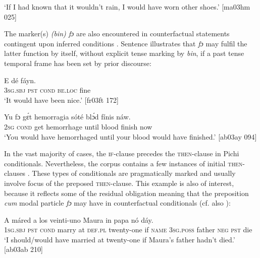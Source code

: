 \glt ‘If I had known that it wouldn’t rain, I would have worn
other shoes.’ [ma03hm 025]
\z

The marker(s) \textit{(bin) fɔ} are also encountered in counterfactual statements contingent upon inferred conditions . Sentence  illustrates that \textit{fɔ} may fulfil the latter function by itself, without explicit tense marking by \textit{bin}, if a past tense temporal frame has been set by prior discourse: 


\ea%
    \label{ex:key:1531}
    \gll E           dé    fáyn.\\
\textsc{3sg.sbj}  \textsc{pst}    \textsc{cond}    \textsc{be.loc}  fine\\

\glt ‘It would have been nice.’ [fr03ft 172]
\z


\ea%
    \label{ex:key:1532}
    \gll Yu  fɔ    gɛ́t  hemorragia  sóté    blɔ́d    fínis    náw.\\
\textsc{2sg}  \textsc{cond}    get  hemorrhage  until  blood  finish  now\\

\glt ‘You would have hemorrhaged until your blood would have finished.’ [ab03ay 094]
\z

In the vast majority of cases, the \textsc{if-}clause precedes the \textsc{then-}clause in Pichi conditionals. Nevertheless, the corpus contains a few instances of initial \textsc{then-}clauses . These types of conditionals are pragmatically marked and usually involve focus of the preposed \textsc{then-}clause. This example is also of interest, because it reflects some of the residual obligation meaning that the preposition \textit{cum} modal particle \textit{fɔ} may have in counterfactual conditionals (cf. also ): 


\ea%
    \label{ex:key:1533}
    \gll A       máred  a  los    veinti-uno    Maura
in    papa  nó    dáy.\\
\textsc{1sg.sbj}  \textsc{pst}  \textsc{cond}    marry  at  \textsc{def.pl}  twenty-one  if  \textsc{name}
\textsc{3sg.poss}  father  \textsc{neg}  \textsc{pst}  die\\

\glt ‘I should/would have married at twenty-one if Maura’s father hadn’t died.’ [ab03ab 210]
\z

